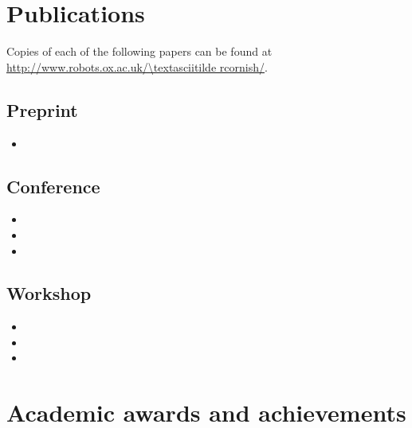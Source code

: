 \documentclass[12pt,a4paper]{article}
\begin{document}
\section*{Publications}

Copies of each of the following papers can be found at \\
\url{http://www.robots.ox.ac.uk/\textasciitilde rcornish/}.

\subsection*{Preprint}

\begin{itemize}
  \item {}
\end{itemize}

\subsection*{Conference}

\begin{itemize}
  \item {}
  \item {}
  \item {}
\end{itemize}

\subsection*{Workshop}

\begin{itemize}
  \item {}
  \item {}
  \item {}
\end{itemize}

\newpage

\section*{Academic awards and achievements}
\end{document}
